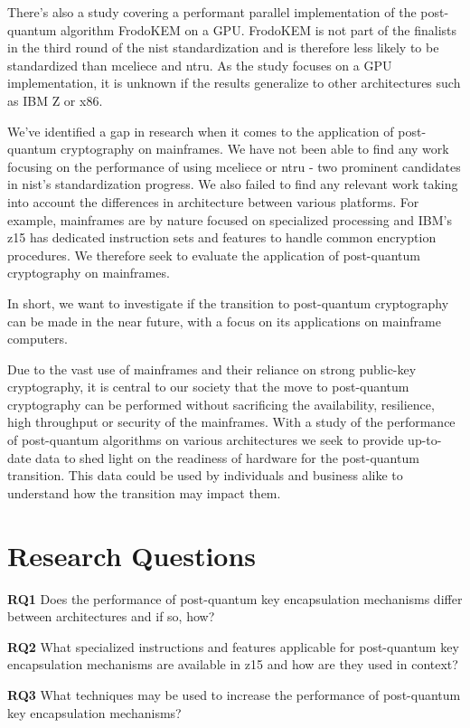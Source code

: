 There's also a study covering a performant parallel implementation of the post-quantum algorithm FrodoKEM on a GPU. FrodoKEM is not part of the finalists in the third round of the \gls{nist} standardization and is therefore less likely to be standardized than \gls{mceliece} and \gls{ntru}\cite{nist2020}. As the study focuses on a GPU implementation, it is unknown if the results generalize to other architectures such as IBM Z or x86.%

We've identified a gap in research when it comes to the application of post-quantum cryptography on mainframes. We have not been able to find any work focusing on the performance of using \gls{mceliece} or \gls{ntru} - two prominent candidates in \gls{nist}'s standardization progress. We also failed to find any relevant work taking into account the differences in architecture between various platforms. For example, mainframes are by nature focused on specialized processing and IBM's z15 has dedicated instruction sets and features to handle common encryption procedures\cite{ibm2020:quantum-computer}. We therefore seek to evaluate the application of post-quantum cryptography on mainframes.

In short, we want to investigate if the transition to post-quantum cryptography can be made in the near future, with a focus on its applications on mainframe computers.

Due to the vast use of mainframes and their reliance on strong public-key cryptography, it is central to our society that the move to post-quantum cryptography can be performed without sacrificing the availability, resilience, high throughput or security of the mainframes. With a study of the performance of post-quantum algorithms on various architectures we seek to provide up-to-date data to shed light on the readiness of hardware for the post-quantum transition. This data could be used by individuals and business alike to understand how the transition may impact them.


\section{Research Questions}
\label{section:introduction:research-questions}

\noindent\textbf{RQ1} Does the performance of \gls{post-quantum} key encapsulation mechanisms differ between architectures and if so, how?\label{rq1}\hfill\par
\noindent\textbf{RQ2} What specialized instructions and features applicable for \gls{post-quantum} key encapsulation mechanisms are available in \gls{z15} and how are they used in context?\label{rq2}\hfill\par
\noindent\textbf{RQ3} What techniques may be used to increase the performance of \gls{post-quantum} key encapsulation mechanisms?\label{rq3}\hfill\par

